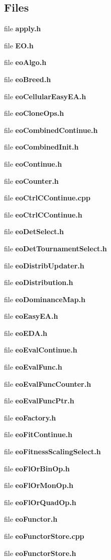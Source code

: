 \subsection*{Files}
\begin{CompactItemize}
\item 
file {\bf apply.h}
\item 
file {\bf EO.h}
\item 
file {\bf eoAlgo.h}
\item 
file {\bf eoBreed.h}
\item 
file {\bf eoCellularEasyEA.h}
\item 
file {\bf eoCloneOps.h}
\item 
file {\bf eoCombinedContinue.h}
\item 
file {\bf eoCombinedInit.h}
\item 
file {\bf eoContinue.h}
\item 
file {\bf eoCounter.h}
\item 
file {\bf eoCtrlCContinue.cpp}
\item 
file {\bf eoCtrlCContinue.h}
\item 
file {\bf eoDetSelect.h}
\item 
file {\bf eoDetTournamentSelect.h}
\item 
file {\bf eoDistribUpdater.h}
\item 
file {\bf eoDistribution.h}
\item 
file {\bf eoDominanceMap.h}
\item 
file {\bf eoEasyEA.h}
\item 
file {\bf eoEDA.h}
\item 
file {\bf eoEvalContinue.h}
\item 
file {\bf eoEvalFunc.h}
\item 
file {\bf eoEvalFuncCounter.h}
\item 
file {\bf eoEvalFuncPtr.h}
\item 
file {\bf eoFactory.h}
\item 
file {\bf eoFitContinue.h}
\item 
file {\bf eoFitnessScalingSelect.h}
\item 
file {\bf eoFlOrBinOp.h}
\item 
file {\bf eoFlOrMonOp.h}
\item 
file {\bf eoFlOrQuadOp.h}
\item 
file {\bf eoFunctor.h}
\item 
file {\bf eoFunctorStore.cpp}
\item 
file {\bf eoFunctorStore.h}
\item 

\end{CompactItemize}
